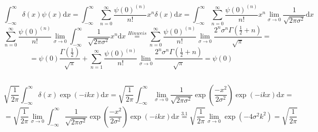 \documentclass[a4paper,11pt]{article}
\begin{document}
\subsection{}
\begin{equation}
        \int_{-\infty}^\infty \delta(x) \psi(x)\text{d}x = \int_{-\infty}^\infty \sum_{n=0}^\infty \frac{\psi(0)^{(n)}}{n!} x^n \delta(x)\text{d}x = \int_{-\infty}^\infty \sum_{n=0}^\infty \frac{\psi(0)^{(n)}}{n!} x^n \lim_{\sigma \to 0}\frac{1}{\sqrt{2\pi\sigma^2}}\text{d}x
\end{equation}
\begin{equation}
        \sum_{n=0}^\infty \frac{\psi(0)^{(n)}}{n!} \lim_{\sigma \to 0} \int_{-\infty}^\infty \frac{1}{\sqrt{2\pi\sigma^2}} x^n \text{d}x \overset{Hinweis}{=} \sum_{n=0}^\infty \frac{\psi(0)^{(n)}}{n!} \lim_{\sigma \to 0} \frac{2^n\sigma^n\Gamma(\frac{1}{2} + n)}{\sqrt{\pi}} = 
\end{equation}
\begin{equation}
        = \psi(0) \frac{\Gamma(\frac{1}{2})}{\sqrt{\pi}} + \sum_{n=1}^\infty \frac{\psi(0)^{(n)}}{n!} \lim_{\sigma \to 0} \frac{2^n\sigma^n\Gamma(\frac{1}{2} + n)}{\sqrt{\pi}} = \psi(0)
\end{equation}
\subsection{}
\begin{equation}
        \sqrt{\frac{1}{2\pi}}\int_{-\infty}^\infty \delta(x) \exp(-ikx)\text{d}x = \sqrt{\frac{1}{2\pi}}\int_{-\infty}^\infty \lim_{\sigma \to 0}\frac{1}{\sqrt{2\pi\sigma^2}}\exp(\frac{-x^2}{2\sigma^2}) \exp(-ikx)\text{d}x = 
\end{equation}
\begin{equation}
        = \sqrt{\frac{1}{2\pi}}\lim_{\sigma \to 0}\int_{-\infty}^\infty \frac{1}{\sqrt{2\pi\sigma^2}}\exp(\frac{-x^2}{2\sigma^2}) \exp(-ikx)\text{d}x \overset{3.1}{=} \sqrt{\frac{1}{2\pi}}\lim_{\sigma \to 0} \exp(-4\sigma^2k^2) = \sqrt{\frac{1}{2\pi}}
\end{equation}
\end{document}
